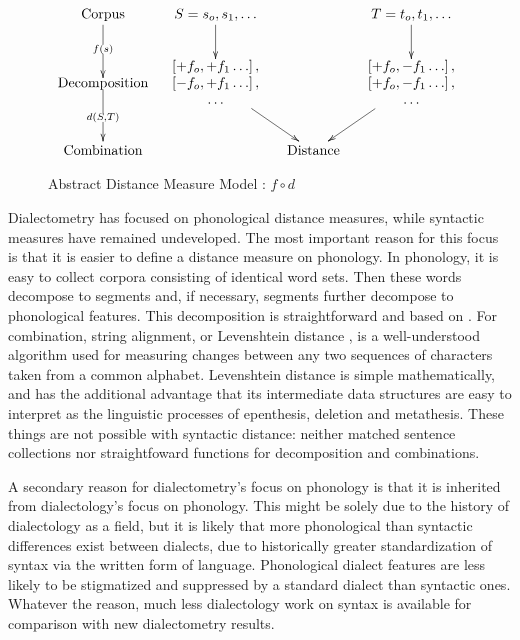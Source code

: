 \begin{figure}
\[\xymatrix@C=1pc{
 \textrm{Corpus} \ar@{>}[d]|{f(s)} &
  S = s_o,s_1,\ldots
  \ar@{>}[d] %
  &&
  T = t_o,t_1,\ldots
  \ar@{>}[d] %
  \\
 *\txt{Decomposition} \ar@{>}[d]|{d(S,T)} &
 *{\begin{array}{c}
     \left[ + f_o, +f_1 \ldots \right], \\
     \left[ - f_o, +f_1 \ldots \right], \\
     \ldots \\ \end{array}}
 \ar@{>}[dr]
 &&
 *{\begin{array}{c}
     \left[ + f_o, -f_1 \ldots \right], \\
     \left[ + f_o, -f_1 \ldots \right], \\
     \ldots \\ \end{array}}
 \ar@{>}[dl]  \\
 \textrm{Combination} &
 & \textrm{Distance} & \\
} \]
\label{abstract-distance-measure-model}
\caption{Abstract Distance Measure Model : $f \circ d$}
\end{figure}

Dialectometry has focused on phonological distance measures, while
syntactic measures have remained undeveloped. The most important
reason for this focus is that it is easier to define a distance
measure on phonology. In phonology, it is easy to collect corpora
consisting of identical word sets. Then these words decompose to segments and,
if necessary, segments further decompose to phonological
features. This decomposition is straightforward and based on
. For combination, string alignment, or Levenshtein
distance \cite{lev65}, is a well-understood algorithm used for
measuring changes between any two sequences of characters taken from a
common alphabet. Levenshtein distance is simple mathematically, and
has the additional advantage that its intermediate data structures are
easy to interpret as the linguistic processes of epenthesis, deletion and
metathesis. These things are not possible
with syntactic distance: neither matched sentence collections nor
straightfoward functions for decomposition and combinations.

A secondary reason for dialectometry's focus on phonology is that it
is inherited from dialectology's focus on phonology.
This might be solely due to the history of dialectology as a field, but it is
likely that more phonological than syntactic differences exist between
dialects, due to historically greater standardization
of syntax via the written form of language. Phonological
dialect features are less likely to be stigmatized and suppressed by a
standard dialect than syntactic ones.
Whatever the reason, much less dialectology work on syntax is
available for comparison with new dialectometry results.

